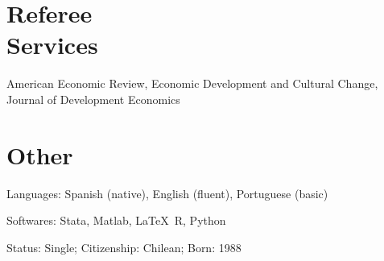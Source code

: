 \documentclass[margin,line]{res}
\begin{document}
\begin{resume}
\section{\sc Referee \\Services}
American Economic Review, Economic Development and Cultural Change, Journal of Development Economics
    
					
\section{\sc Other} 
Languages: Spanish (native), English (fluent), Portuguese (basic)

 \vspace*{-2.5mm}
 Softwares:  Stata, Matlab, \LaTeX\, R, Python
 
%
 \vspace*{-2.5mm}
Status: Single; Citizenship: Chilean; Born: 1988  \\
 

     


\end{resume}
\end{document}
